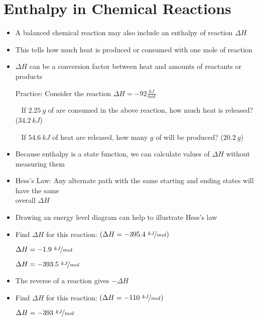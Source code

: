 \documentclass[12pt, openany, letterpaper]{memoir}
\begin{document}
\section{Enthalpy in Chemical Reactions}
\begin{itemize}
	\item A balanced chemical reaction may also include an enthalpy of reaction $\Delta H$
	\item This tells how much heat is produced or consumed with one mole of reaction
	\item $\Delta H$ can be a conversion factor between heat and amounts of reactants or products

	      Practice: Consider the reaction  $\Delta H = -92\frac{kJ}{mol}$

	      ~\hphantom{Practice:} If $2.25~g$ of  are consumed in the above reaction, how much heat is released? ($34.2~kJ$)

	      ~\hphantom{Practice:} If $54.6~kJ$ of heat are released, how many $g$ of  will be produced? ($20.2~g$)
	\item Because enthalpy is a state function, we can calculate values of $\Delta H$ without measuring them
	\item Hess's Law: Any alternate path with the same starting and ending states will have the same\\overall $\Delta H$
	\item Drawing an energy level diagram can help to illustrate Hess's law
	\item Find $\Delta H$ for this reaction:  \hspace{1em} $\left(\Delta H=-395.4~\nicefrac{kJ}{mol}\right)$

	       \hspace{2em} $\Delta H=-1.9~\nicefrac{kJ}{mol}$

	       \hspace{2em} $\Delta H=-393.5~\nicefrac{kJ}{mol}$
	\item The reverse of a reaction gives $-\Delta H$
	\item Find $\Delta H$ for this reaction:  \hspace{1em} $\left(\Delta H=-110~\nicefrac{kJ}{mol}\right)$

	       \hspace{2em} $\Delta H=-393~\nicefrac{kJ}{mol}$


\end{itemize}
\end{document}
